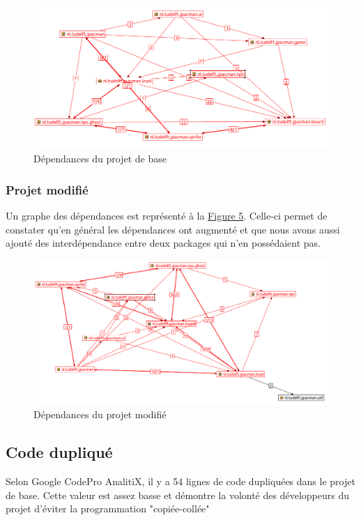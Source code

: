 \documentclass[a4paper,12pt]{report} %
\begin{document}
\begin{figure}[!h]
\begin{center}\includegraphics[scale=0.5]{ressources/final_initial_dependencies}\end{center}
\caption{Dépendances du projet de base}\label{figure4}
\end{figure}

\subsubsection{Projet modifié}

Un graphe des dépendances est représenté à la \hyperref[figure5]{Figure 5}. Celle-ci permet de constater qu'en général les dépendances ont augmenté et que nous avons aussi
ajouté des interdépendance entre deux packages qui n'en possédaient
pas.

\begin{figure}[!h]
\begin{center}\includegraphics[scale=0.5]{ressources/final_new_dependencies}\end{center}\caption{Dépendances du projet modifié}\label{figure5}


\end{figure}

\subsection{Code dupliqué}
Selon Google CodePro AnalitiX, il y a 54 lignes de code dupliquées
dans le projet de base. Cette valeur est assez basse et démontre la
volonté des développeurs du projet d'éviter la programmation "copiée-collée"
\end{document}
